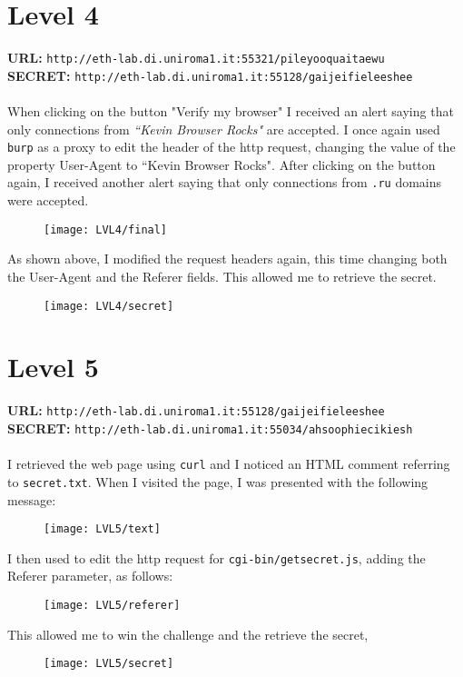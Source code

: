 \documentclass[12pt,a4paper]{article}
\begin{document}
	\section*{Level 4}
	\textbf{URL: }\texttt{http://eth-lab.di.uniroma1.it:55321/pileyooquaitaewu}\\
	\textbf{SECRET: }\texttt{http://eth-lab.di.uniroma1.it:55128/gaijeifieleeshee}\\\\
	When clicking on the button "Verify my browser" I received an alert saying that only connections from \textit{``Kevin Browser Rocks"} are accepted. I once again used \texttt{burp} as a proxy to edit the header of the http request, changing the value of the property User-Agent to ``Kevin Browser Rocks". After clicking on the button again, I received another alert saying that only connections from \texttt{.ru} domains were accepted.\\
	\begin{figure}[H]
		\centering
		\texttt{[image: LVL4/final]}
		\label{fig:russian4}
	\end{figure}
	As shown above, I modified the request headers again, this time changing both the User-Agent and the Referer fields. This allowed me to retrieve the secret.
	\begin{figure}[H]
		\centering
		\texttt{[image: LVL4/secret]}
		\label{fig:secret4}
	\end{figure}
	\newpage

	\section*{Level 5}
	\textbf{URL: }\texttt{http://eth-lab.di.uniroma1.it:55128/gaijeifieleeshee}\\
	\textbf{SECRET: }\texttt{http://eth-lab.di.uniroma1.it:55034/ahsoophiecikiesh }\\\\
	I retrieved the web page using \texttt{curl} and I noticed an HTML comment referring to \texttt{secret.txt}. When I visited the page, I was presented with the following message:
	\begin{figure}[H]
		\centering
		\texttt{[image: LVL5/text]}
		\label{fig:comment5}
	\end{figure}
	I then used  to edit the http request for \texttt{cgi-bin/getsecret.js}, adding the Referer parameter, as follows:
	\begin{figure}[H]
		\centering
		\texttt{[image: LVL5/referer]}
		\label{fig:referer5}
	\end{figure}
	This allowed me to win the challenge and the retrieve the secret,
	\begin{figure}[H]
		\centering
		\texttt{[image: LVL5/secret]}
		\label{fig:secret5}
	\end{figure}
\end{document}
